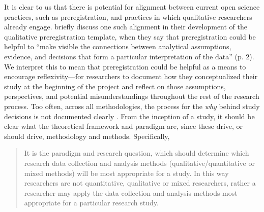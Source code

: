 \documentclass[authordate, meta, issue]{jote-new-article}
\begin{document}
It is clear to us that there is potential for alignment between current open science practices, such as preregistration, and practices in which qualitative researchers already engage. \textcites{Haven2020} briefly discuss one such alignment in their development of the qualitative preregistration template, when they say that preregistration could be helpful to “make visible the connections between analytical assumptions, evidence, and decisions that form a particular interpretation of the data” (p. 2). We interpret this to mean that preregistration could be helpful as a means to encourage reflexivity—for researchers to document how they conceptualized their study at the beginning of the project and reflect on those assumptions, perspectives, and potential misunderstandings throughout the rest of the research process. Too often, across all methodologies, the process for the \emph{why} behind study decisions is not documented clearly \parencites{Mackenzie2006}. From the inception of a study, it should be clear what the theoretical framework and paradigm are, since these drive, or should drive, methodology and methods. Specifically,



\begin{quote}
  It is the paradigm and research question, which should determine which research data collection and analysis methods (qualitative/quantitative or mixed methods) will be most appropriate for a study. In this way researchers are not quantitative, qualitative or mixed researchers, rather a researcher may apply the data collection and analysis methods most appropriate for a particular research study. \parencites[page 7-8]{Mackenzie2006}
\end{quote}
\end{document}
